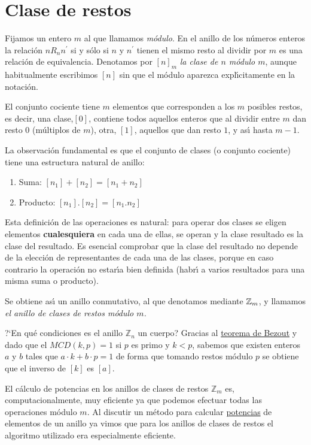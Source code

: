 \section{Clase de restos}

Fijamos un entero $m$ al que llamamos {\itshape m\'odulo}. 
En el anillo de los n\'umeros enteros la relaci\'on  $nR_{n}n^\prime 
$ si  y s\'olo si   $n$ y $n^\prime$ tienen el mismo resto al 
dividir por $m$ es una relaci\'on de equivalencia. Denotamos por $[ 
n]_m$ {\itshape la clase de $n$ m\'odulo $m$},  aunque habitualmente  escribimos
$[n]$
sin que el m\'odulo aparezca expl\'{\i}citamente en la notaci\'on.



El conjunto cociente tiene $m$ elementos que corresponden a los 
$m$ posibles restos, es decir, una clase,$[0]$, contiene todos 
aquellos enteros que al dividir entre $m$ dan resto $0$ (m\'ultiplos 
de $m$), otra, $[1]$, aquellos que dan resto $1$, y as\'{\i}  hasta $m-
1$.


La observaci\'on fundamental es que el conjunto de clases (o 
conjunto cociente) tiene una estructura natural de anillo:
\begin{enumerate}
\item Suma: $[n_1]+[n_2]=[n_1+n_2]$
\item Producto: $[n_1].[n_2]=[n_1. n_2]$
\end{enumerate}

Esta definici\'on de las operaciones es natural: para operar dos 
clases se eligen elementos {\bf cualesquiera} en cada una de ellas, 
se operan y la clase resultado es la clase del resultado.  Es 
esencial comprobar que la clase del resultado no depende de la 
elecci\'on de representantes de cada una de las clases, porque en 
caso contrario la operaci\'on no estar\'{\i}a bien definida (habr\'{\i} 
a varios resultados para una misma suma o producto). 

Se obtiene as\'{\i}   un 
anillo conmutativo, al que denotamos mediante $\Bbb Z_{m}$, y llamamos {\itshape
el anillo de clases de restos m\'odulo $m$.} 

?`En qu\'e condiciones es el anillo $\mathbb{Z}_{n}$ un cuerpo?  Gracias al
\hyperref[bezout]{teorema de Bezout} y dado que el $MCD(k,p)=1$ si
$p$ es primo y $k<p$, sabemos
que existen enteros $a$ y $b$ tales que $a\cdot k+b\cdot p=1$ de forma que
tomando restos m\'odulo $p$ se obtiene que el inverso de $[k]$ es $[a].$


El c\'alculo de potencias en los anillos de clases de restos $\mathbb{Z}_m$ es, 
computacionalmente, muy eficiente ya que podemos efectuar todas las operaciones
m\'odulo $m$. Al discutir  un m\'etodo para
calcular \hyperref[potencias]{potencias} de elementos de un anillo ya vimos que
para los anillos de clases de restos el algoritmo utilizado era  especialmente
eficiente.


